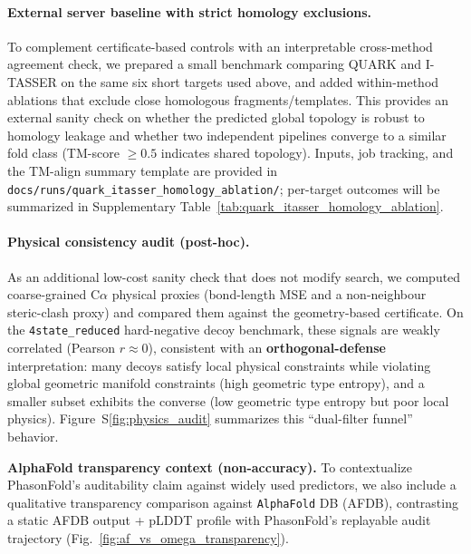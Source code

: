 \paragraph{External server baseline with strict homology exclusions.}
To complement certificate-based controls with an interpretable cross-method agreement check, we prepared a small benchmark comparing QUARK and I-TASSER on the same six short targets used above, and added within-method ablations that exclude close homologous fragments/templates. This provides an external sanity check on whether the predicted global topology is robust to homology leakage and whether two independent pipelines converge to a similar fold class (TM-score $\ge 0.5$ indicates shared topology). Inputs, job tracking, and the TM-align summary template are provided in \texttt{docs/runs/quark\_itasser\_homology\_ablation/}; per-target outcomes will be summarized in Supplementary Table~\ref{tab:quark_itasser_homology_ablation}.

\paragraph{Physical consistency audit (post-hoc).}
As an additional low-cost sanity check that does not modify search, we computed coarse-grained C$\alpha$ physical proxies (bond-length MSE and a non-neighbour steric-clash proxy) and compared them against the geometry-based certificate. On the \texttt{4state\_reduced} hard-negative decoy benchmark, these signals are weakly correlated (Pearson $r\approx 0$), consistent with an \textbf{orthogonal-defense} interpretation: many decoys satisfy local physical constraints while violating global geometric manifold constraints (high geometric type entropy), and a smaller subset exhibits the converse (low geometric type entropy but poor local physics). Figure~S\ref{fig:physics_audit} summarizes this ``dual-filter funnel'' behavior.

\textbf{AlphaFold transparency context (non-accuracy).} To contextualize PhasonFold's auditability claim against widely used predictors, we also include a qualitative transparency comparison against \texttt{AlphaFold} DB (AFDB), contrasting a static AFDB output + pLDDT profile with PhasonFold's replayable audit trajectory (Fig.~\ref{fig:af_vs_omega_transparency}).

